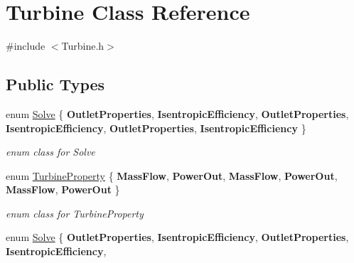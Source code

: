 \hypertarget{class_turbine}{}\section{Turbine Class Reference}
\label{class_turbine}


{\ttfamily \#include $<$Turbine.\+h$>$}

\subsection*{Public Types}
\begin{DoxyCompactItemize}
\item 
\mbox{\label{class_turbine_a9fd7beba6c6f071e228fbe3e07969d2b}} 
enum \hyperlink{class_turbine_a9fd7beba6c6f071e228fbe3e07969d2b}{Solve} \{ \newline
{\bfseries Outlet\+Properties}, 
{\bfseries Isentropic\+Efficiency}, 
{\bfseries Outlet\+Properties}, 
{\bfseries Isentropic\+Efficiency}, 
\newline
{\bfseries Outlet\+Properties}, 
{\bfseries Isentropic\+Efficiency}
 \}\begin{DoxyCompactList}\small\item\em enum class for Solve \end{DoxyCompactList}
\item 
\mbox{\label{class_turbine_a5db4f65cf2539e3837684d53221ade12}} 
enum \hyperlink{class_turbine_a5db4f65cf2539e3837684d53221ade12}{Turbine\+Property} \{ \newline
{\bfseries Mass\+Flow}, 
{\bfseries Power\+Out}, 
{\bfseries Mass\+Flow}, 
{\bfseries Power\+Out}, 
\newline
{\bfseries Mass\+Flow}, 
{\bfseries Power\+Out}
 \}\begin{DoxyCompactList}\small\item\em enum class for Turbine\+Property \end{DoxyCompactList}
\item 
\mbox{\label{class_turbine_a9fd7beba6c6f071e228fbe3e07969d2b}} 
enum \hyperlink{class_turbine_a9fd7beba6c6f071e228fbe3e07969d2b}{Solve} \{ \newline
{\bfseries Outlet\+Properties}, 
{\bfseries Isentropic\+Efficiency}, 
{\bfseries Outlet\+Properties}, 
{\bfseries Isentropic\+Efficiency}, 
\newline

\end{DoxyCompactItemize}
